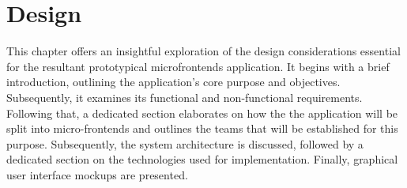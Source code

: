 \chapter{Design}
\label{chap:Design} 
This chapter offers an insightful exploration of the design considerations essential for the resultant prototypical microfrontends application. It begins with a brief introduction, outlining the application's core purpose and objectives. Subsequently, it examines its functional and non-functional requirements. Following that, a dedicated section elaborates on how the the application will be split into micro-frontends and outlines the teams that will be established for this purpose. Subsequently, the system architecture is discussed, followed by a dedicated section on the technologies used for implementation. Finally, graphical user interface mockups are presented.





